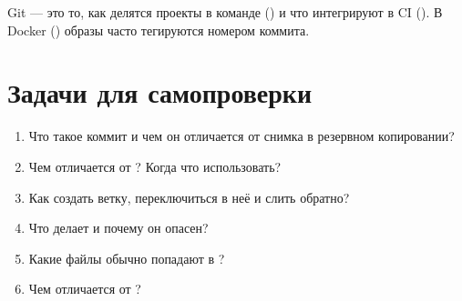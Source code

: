 Git --- это то, как делятся проекты в команде
() и что
интегрируют в CI (). В Docker
() образы часто
тегируются номером коммита.

\section{Задачи для самопроверки}
\begin{enumerate}
  \item Что такое коммит и чем он отличается от
    снимка в резервном копировании?
  \item Чем  отличается от ?
    Когда что использовать?
  \item Как создать ветку, переключиться в неё и
    слить обратно?
  \item Что делает  и почему он
    опасен?
  \item Какие файлы обычно попадают в
    ?
  \item Чем  отличается от ?
\end{enumerate}
